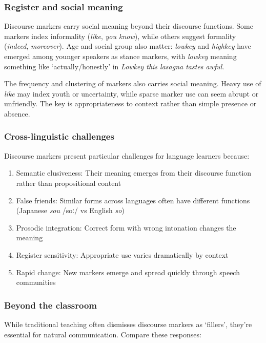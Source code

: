 \subsubsection*{Register and social meaning}

Discourse markers carry social meaning beyond their discourse functions. Some markers index informality (\textit{like}, \textit{you know}), while others suggest formality (\textit{indeed}, \textit{moreover}). Age and social group also matter: \textit{lowkey} and \textit{highkey} have emerged among younger speakers as stance markers, with \textit{lowkey} meaning something like `actually/honestly' in \textit{Lowkey this lasagna tastes awful}.

The frequency and clustering of markers also carries social meaning. Heavy use of \textit{like} may index youth or uncertainty, while sparse marker use can seem abrupt or unfriendly. The key is appropriateness to context rather than simple presence or absence.

\subsubsection*{Cross-linguistic challenges}

Discourse markers present particular challenges for language learners because:

\begin{enumerate}[noitemsep]
   \item Semantic elusiveness: Their meaning emerges from their discourse function rather than propositional content
   \item False friends: Similar forms across languages often have different functions (Japanese \textit{sou} /soː/ vs English \textit{so})
   \item Prosodic integration: Correct form with wrong intonation changes the meaning
   \item Register sensitivity: Appropriate use varies dramatically by context
   \item Rapid change: New markers emerge and spread quickly through speech communities
\end{enumerate}

\subsubsection*{Beyond the classroom}

While traditional teaching often dismisses discourse markers as `fillers', they're essential for natural communication. Compare these responses:

